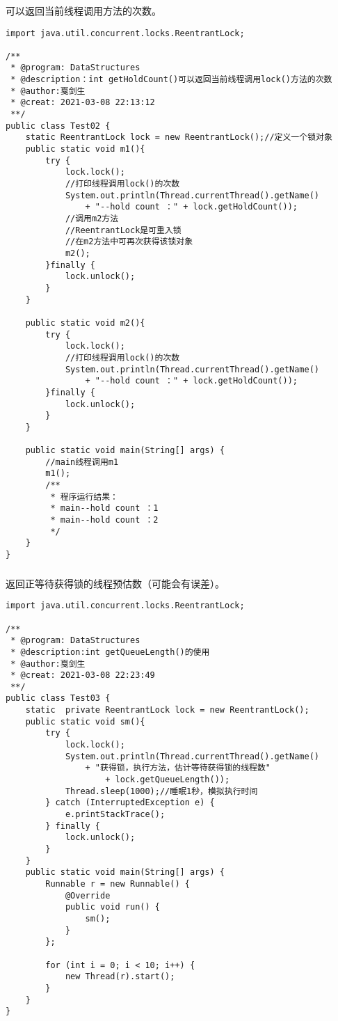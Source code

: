 \documentclass[a4paper]{report}
\begin{document}
\subsubsection{}
可以返回当前线程调用方法的次数。

\begin{Verbatim}[frame=single,numbersep=5pt,xleftmargin=1.5em,xrightmargin=1.5em]
import java.util.concurrent.locks.ReentrantLock;

/**
 * @program: DataStructures
 * @description：int getHoldCount()可以返回当前线程调用lock()方法的次数
 * @author:戛剑生
 * @creat: 2021-03-08 22:13:12
 **/
public class Test02 {
    static ReentrantLock lock = new ReentrantLock();//定义一个锁对象
    public static void m1(){
        try {
            lock.lock();
            //打印线程调用lock()的次数
            System.out.println(Thread.currentThread().getName()
                + "--hold count ：" + lock.getHoldCount());
            //调用m2方法
            //ReentrantLock是可重入锁
            //在m2方法中可再次获得该锁对象
            m2();
        }finally {
            lock.unlock();
        }
    }

    public static void m2(){
        try {
            lock.lock();
            //打印线程调用lock()的次数
            System.out.println(Thread.currentThread().getName()
                + "--hold count ：" + lock.getHoldCount());
        }finally {
            lock.unlock();
        }
    }

    public static void main(String[] args) {
        //main线程调用m1
        m1();
        /**
         * 程序运行结果：
         * main--hold count ：1
         * main--hold count ：2
         */
    }
}\end{Verbatim}
\subsubsection{}
返回正等待获得锁的线程预估数（可能会有误差）。

\begin{Verbatim}[frame=single,numbersep=5pt,xleftmargin=1.5em,xrightmargin=1.5em]
import java.util.concurrent.locks.ReentrantLock;

/**
 * @program: DataStructures
 * @description:int getQueueLength()的使用
 * @author:戛剑生
 * @creat: 2021-03-08 22:23:49
 **/
public class Test03 {
    static  private ReentrantLock lock = new ReentrantLock();
    public static void sm(){
        try {
            lock.lock();
            System.out.println(Thread.currentThread().getName()
                + "获得锁，执行方法，估计等待获得锁的线程数"
                    + lock.getQueueLength());
            Thread.sleep(1000);//睡眠1秒，模拟执行时间
        } catch (InterruptedException e) {
            e.printStackTrace();
        } finally {
            lock.unlock();
        }
    }
    public static void main(String[] args) {
        Runnable r = new Runnable() {
            @Override
            public void run() {
                sm();
            }
        };

        for (int i = 0; i < 10; i++) {
            new Thread(r).start();
        }
    }
}
\end{Verbatim}
\end{document}
